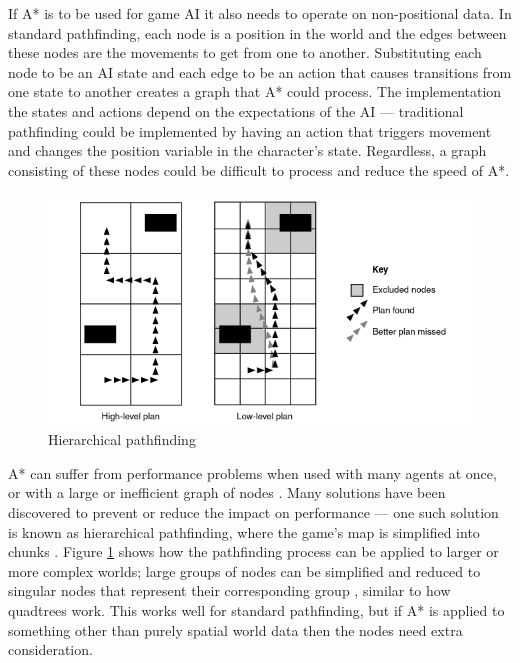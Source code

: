 \documentclass[11pt, a4paper]{report}
\begin{document}
If A* is to be used for game AI it also needs to operate on non-positional data. In standard pathfinding, each node is a position in the world and the edges between these nodes are the movements to get from one to another. Substituting each node to be an AI state and each edge to be an action that causes transitions from one state to another creates a graph that A* could process. The implementation the states and actions depend on the expectations of the AI --- traditional pathfinding could be implemented by having an action that triggers movement and changes the position variable in the character's state. Regardless, a graph consisting of these nodes could be difficult to process and reduce the speed of A*.

\begin{figure}[!h]
  \centering
  \includegraphics[width=\linewidth]{img/hierarchical_pathfinding.png}
  \caption{Hierarchical pathfinding \parencite[263]{millington2019ai}}
  \label{fig:hierarchicalPathfinding}
\end{figure}

A* can suffer from performance problems when used with many agents at once, or with a large or inefficient graph of nodes \parencite{graham2003pathfinding}. Many solutions have been discovered to prevent or reduce the impact on performance --- one such solution is known as hierarchical pathfinding, where the game's map is simplified into chunks \parencite[126]{cui2011based}. Figure \ref{fig:hierarchicalPathfinding} shows how the pathfinding process can be applied to larger or more complex worlds; large groups of nodes can be simplified and reduced to singular nodes that represent their corresponding group \parencite{botea2004near}, similar to how quadtrees work. This works well for standard pathfinding, but if A* is applied to something other than purely spatial world data then the nodes need extra consideration. 
\end{document}
